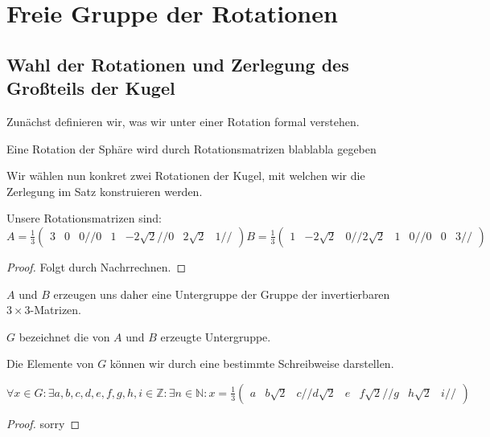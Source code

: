 \chapter{Freie Gruppe der Rotationen}


\section{Wahl der Rotationen und Zerlegung des Großteils der Kugel}

Zunächst definieren wir, was wir unter einer Rotation formal verstehen.
\begin{definition}[Rotationsmatrix]\label{def:rot}
Eine Rotation der Sphäre wird durch Rotationsmatrizen blablabla gegeben
\end{definition}


Wir wählen nun konkret zwei Rotationen der Kugel, mit welchen wir die Zerlegung im Satz konstruieren werden.
\begin{definition}\label{def:konk_rot}
Unsere Rotationsmatrizen sind: 
$A=\frac{1}{3}\begin{pmatrix} 3 & 0 & 0 //
                              0 & 1 & -2\sqrt{2} //
                              0 & 2\sqrt{2} & 1 //
\end{pmatrix}
B=\frac{1}{3}\begin{pmatrix} 1 & -2\sqrt{2} & 0 //
                             2\sqrt{2} & 1 & 0 //
                             0 & 0 & 3 //
\end{pmatrix}$
\end{definition}

\begin{proof} 
Folgt durch Nachrrechnen.
\end{proof}

$A$ und $B$ erzeugen uns daher eine Untergruppe der Gruppe der invertierbaren $3\times3$-Matrizen.
\begin{definition}\label{def:konk_rot_erzeugt}
$G$ bezeichnet die von $A$ und $B$ erzeugte Untergruppe.
\end{definition}

Die Elemente von $G$ können wir durch eine bestimmte Schreibweise darstellen.
\begin{lemma}\label{lem:darst_von_rot_matrix}
$\forall x\in G:\exists a,b,c,d,e,f,g,h,i\in\mathbb{Z}:\exists n\in\mathbb{N}: x=\frac{1}{3}\begin{pmatrix} a & b\sqrt{2} & c //
                                                                                                            d\sqrt{2} & e & f\sqrt{2} //
                                                                                                            g & h\sqrt{2} & i //
\end{pmatrix}$ 
\end{lemma}
\begin{proof}
sorry
\end{proof}

